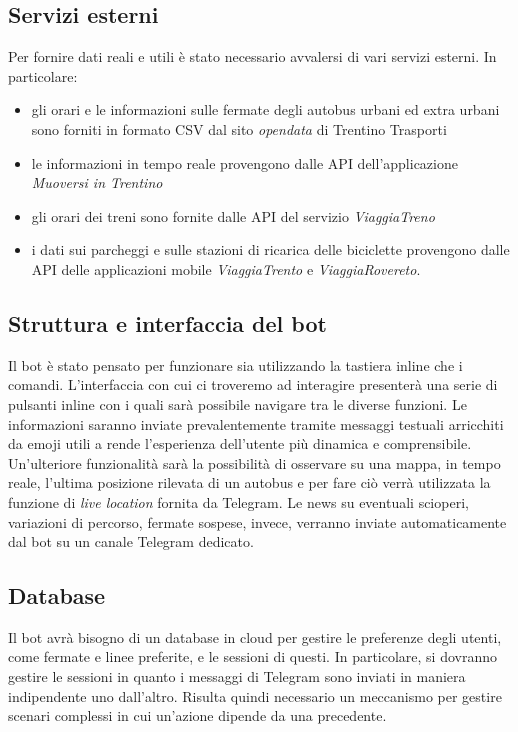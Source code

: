 \subsection{Servizi esterni}

Per fornire dati reali e utili è stato necessario avvalersi di vari servizi esterni. In particolare: 
\begin{itemize}
\item gli orari e le informazioni sulle fermate degli autobus urbani ed extra urbani sono forniti in formato CSV dal sito \textit{opendata} di Trentino Trasporti \cite{opendataTrentinoTrasporti}
\item le informazioni in tempo reale provengono dalle API dell'applicazione \textit{Muoversi in Trentino}
\item gli orari dei treni sono fornite dalle API del servizio \textit{ViaggiaTreno}
\item i dati sui parcheggi e sulle stazioni di ricarica delle biciclette provengono dalle API delle applicazioni mobile \textit{ViaggiaTrento} e \textit{ViaggiaRovereto}.
\end{itemize}

\subsection{Struttura e interfaccia del bot}
Il bot è stato pensato per funzionare sia utilizzando la tastiera inline che i comandi. 
L'interfaccia con cui ci troveremo ad interagire presenterà una serie di pulsanti inline con i quali sarà possibile navigare tra le diverse funzioni. Le informazioni saranno inviate prevalentemente tramite messaggi testuali arricchiti da emoji utili a rende l'esperienza dell'utente più dinamica e comprensibile. 
Un'ulteriore funzionalità sarà la possibilità di osservare su una mappa, in tempo reale, l'ultima posizione rilevata di un autobus e per fare ciò verrà utilizzata la funzione di \textit{live location} fornita da Telegram. 
Le news su eventuali scioperi, variazioni di percorso, fermate sospese, invece, verranno inviate automaticamente dal bot su un canale Telegram dedicato. 

\subsection{Database}
Il bot avrà bisogno di un database in cloud per gestire le preferenze degli utenti, come fermate e linee preferite, e le sessioni di questi. In particolare, si dovranno gestire le sessioni in quanto i messaggi di Telegram sono inviati in maniera indipendente uno dall'altro. Risulta quindi necessario un meccanismo per gestire scenari complessi in cui un'azione dipende da una precedente. 

\newpage